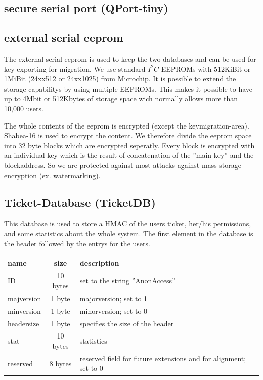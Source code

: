 
\subsection{secure serial port (QPort-tiny)}


\subsection{external serial eeprom}
The external serial eeprom is used to keep the two databases and can be used for key-exporting for migration. We use standard $I^2C$ EEPROMs with 512KiBit or 1MiBit (24xx512 or 24xx1025) from Microchip. It is possible to extend the storage capabilitys by using multiple EEPROMs. This makes it possible to have up to 4Mbit or 512Kbytes of storage space wich normally allows more than 10,000 users.

The whole contents of the eeprom is encrypted (except the keymigration-area). Shabea-16 is used to encrypt the content. We therefore divide the eeprom space into 32 byte blocks which are encrypted seperatly. Every block is encrypted with an individual key which is the result of concatenation of the ''main-key'' and the blockaddress. So we are protected against most attacks against mass storage encryption (ex. watermarking).


\subsection{Ticket-Database (TicketDB)}
This database is used to store a HMAC of the users ticket, her/his permissions, and some statistics about the whole system.
The first element in the database is the header followed by the entrys for the users.\\
\begin{tabular}{|l|c|l|}\hline 
name & size & description \\ \hline
ID & 10 bytes & set to the string ''AnonAccess'' \\
majversion & 1 byte & majorversion; set to 1 \\
minversion & 1 byte & minorversion; set to 0 \\
headersize & 1 byte & specifies the size of the header \\
stat & 10 bytes & statistics \\
reserved & 8 bytes & reserved field for future extensions and for alignment; set to 0 \\ \hline
\end{tabular} 

